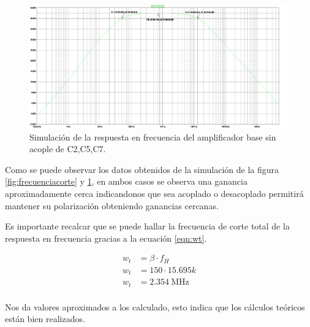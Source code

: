 \begin{enumerate}
        \begin{figure}[H]
          \centering
          \includegraphics[width=\textwidth]{Imagenes/sim_resp_frecu_sin.png}
          \caption{Simulación de la respuesta en frecuencia del amplificador base sin acople de C2,C5,C7.}
          \label{fig:frecuenciacortesinacople}
        \end{figure}

        Como se puede observar los datos obtenidos de la simulación de la figura \ref{fig:frecuenciacorte} y \ref{fig:frecuenciacortesinacople}, en ambos casos se observa una ganancia aproximadamente cerca indicandonos que sea acoplado o desacoplado permitirá mantener su polarización
        obteniendo ganancias cercanas.

        Es importante recalcar que se puede hallar la frecuencia de corte total de la respuesta en frecuencia gracias a la ecuación \ref{eqn:wt}.

        \begin{align*}
          w_t & =\beta \cdot f_H         \\[0.2cm]
          w_t & =150 \cdot 15.695k       \\[0.2cm]
          w_t & =\SI{2.354}{\mega\hertz} \\[0.2cm]
        \end{align*}

        Nos da valores aproximados a los calculado, esto indica que los cálculos teóricos están bien realizados.

\end{enumerate}

